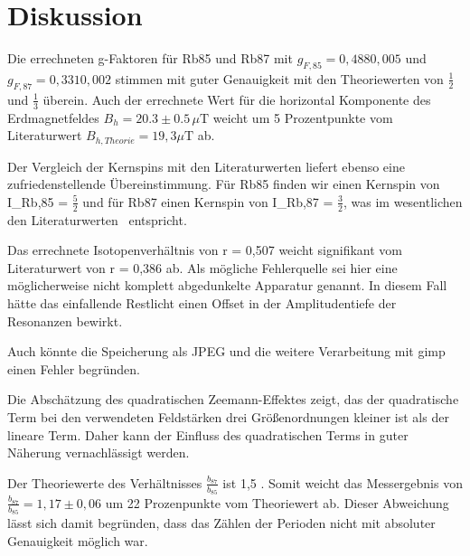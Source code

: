 \section{Diskussion}
Die errechneten g-Faktoren für Rb85 und Rb87 mit $g_{F,85} = 0,488 $\pm$ 0,005$ und
$g_{F,87} = 0,331 $\pm$ 0,002$ stimmen mit guter Genauigkeit mit den Theoriewerten von $\frac{1}{2}$ und $\frac{1}{3}$ überein.
Auch der errechnete Wert für die horizontal Komponente des Erdmagnetfeldes $B_{h} = 20.3\pm0.5\,\mu\text{T}$ weicht um 5 Prozentpunkte vom
Literaturwert $B_{h,Theorie} = 19,3\mu\text{T}$ \cite{hB} ab.

Der Vergleich der Kernspins mit den Literaturwerten liefert ebenso eine zufriedenstellende Übereinstimmung.
Für Rb85 finden wir einen Kernspin von  I_{Rb,85} = $\frac{5}{2}$ und für Rb87 einen Kernspin von I_{Rb,87} = $\frac{3}{2}$, was im wesentlichen den Literaturwerten \cite{coreSpin} entspricht.

Das errechnete Isotopenverhältnis von r = 0,507 weicht signifikant vom Literaturwert von r = 0,386  ab. Als mögliche Fehlerquelle
sei hier eine möglicherweise nicht komplett abgedunkelte Apparatur genannt. In diesem Fall hätte das einfallende Restlicht
einen Offset in der Amplitudentiefe der Resonanzen bewirkt.

Auch könnte die Speicherung als JPEG und die weitere Verarbeitung mit gimp einen Fehler begründen.

Die Abschätzung des quadratischen Zeemann-Effektes zeigt, das der quadratische Term bei den verwendeten Feldstärken drei Größenordnungen kleiner ist als der lineare Term. Daher kann der Einfluss des quadratischen Terms in guter Näherung vernachlässigt werden.

Der Theoriewerte des Verhältnisses $\frac{b_{87}}{b_{85}}$ ist 1,5 \cite{FP}. Somit weicht das Messergebnis von $\frac{b_{87}}{b_{85}} = 1,17 \pm 0,06$ um 22 Prozenpunkte vom Theoriewert ab.
Dieser Abweichung lässt sich damit begründen, dass das Zählen der Perioden nicht mit absoluter Genauigkeit möglich war.

\printbibliography
